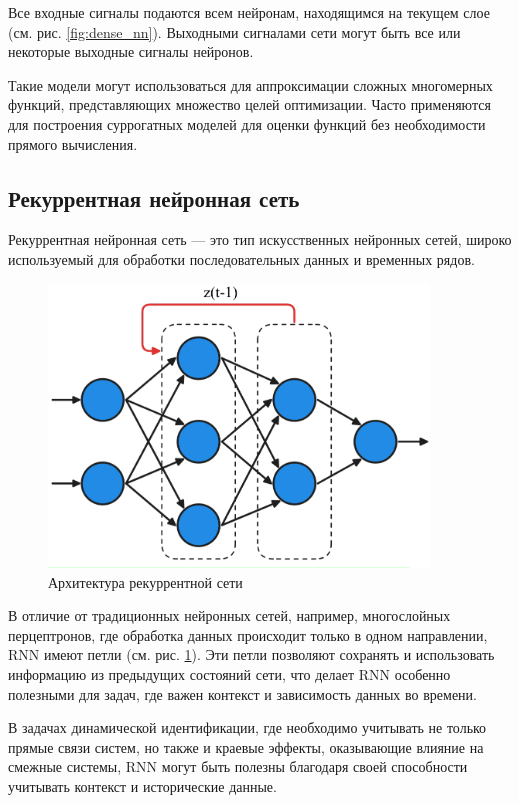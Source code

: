 Все входные сигналы подаются всем нейронам, находящимся 
на текущем слое (см. рис. \ref{fig:dense_nn}). Выходными сигналами сети могут быть все или некоторые
выходные сигналы нейронов.

Такие модели могут использоваться для аппроксимации сложных многомерных
функций, представляющих множество целей оптимизации. Часто применяются для
построения суррогатных моделей для оценки функций без необходимости прямого
вычисления.

\subsection{Рекуррентная нейронная сеть}

Рекуррентная нейронная сеть — это тип искусственных нейронных сетей, широко
используемый для обработки последовательных данных и временных рядов. 

\begin{figure}[H]
  \centering
    \includegraphics[width=0.9\textwidth]{figures/arch_rnn.png}
  \caption{Архитектура рекуррентной сети}\label{fig:rnn}
\end{figure}

В отличие от традиционных нейронных сетей, например, многослойных перцептронов, где
обработка данных происходит только в одном направлении, RNN имеют петли (см.
рис. \ref{fig:rnn}). Эти петли позволяют сохранять и использовать информацию из 
предыдущих состояний сети, что делает RNN особенно полезными для задач, где важен 
контекст и зависимость данных во времени. 

В задачах динамической идентификации, где необходимо учитывать не только прямые
связи систем, но также и краевые эффекты, оказывающие влияние на смежные
системы, RNN могут быть полезны благодаря своей способности учитывать контекст
и исторические данные.

